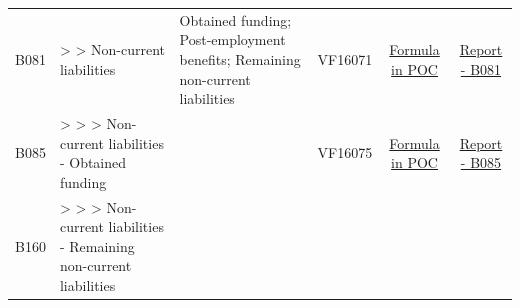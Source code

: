 \documentclass[]{book}
\begin{document}
\begin{longtable}[]{@{}cllccc@{}}
\begin{minipage}[t]{0.08\columnwidth}
B081\strut
\end{minipage} & \begin{minipage}[t]{0.20\columnwidth}\raggedright
\textgreater{} \textgreater{} Non-current liabilities\strut
\end{minipage} & \begin{minipage}[t]{0.16\columnwidth}\raggedright
Obtained funding; Post-employment benefits; Remaining non-current liabilities\strut
\end{minipage} & \begin{minipage}[t]{0.09\columnwidth}\centering
VF16071\strut
\end{minipage} & \begin{minipage}[t]{0.15\columnwidth}\centering
\protect\hyperlink{b081---formula-in-poc}{Formula in POC}\strut
\end{minipage} & \begin{minipage}[t]{0.16\columnwidth}\centering
\href{./Auxiliary\%20Files/technical_reports/variable_report/B081(!).pdf}{Report - B081}\strut
\end{minipage}\tabularnewline
\begin{minipage}[t]{0.08\columnwidth}\centering
B085\strut
\end{minipage} & \begin{minipage}[t]{0.20\columnwidth}\raggedright
\textgreater{} \textgreater{} \textgreater{} Non-current liabilities - Obtained funding\strut
\end{minipage} & \begin{minipage}[t]{0.16\columnwidth}\raggedright
\strut
\end{minipage} & \begin{minipage}[t]{0.09\columnwidth}\centering
VF16075\strut
\end{minipage} & \begin{minipage}[t]{0.15\columnwidth}\centering
\protect\hyperlink{b085---formula-in-poc}{Formula in POC}\strut
\end{minipage} & \begin{minipage}[t]{0.16\columnwidth}\centering
\href{./Auxiliary\%20Files/technical_reports/variable_report/B085(!).pdf}{Report - B085}\strut
\end{minipage}\tabularnewline
\begin{minipage}[t]{0.08\columnwidth}\centering
B160\strut
\end{minipage} & \begin{minipage}[t]{0.20\columnwidth}\raggedright
\textgreater{} \textgreater{} \textgreater{} Non-current liabilities - Remaining non-current liabilities\strut

\end{minipage}
\end{longtable}
\end{document}
